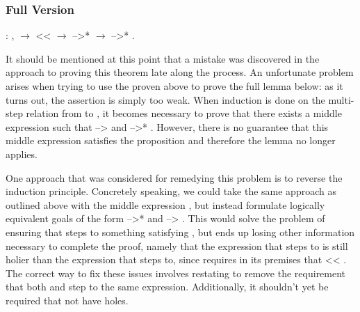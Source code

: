 \documentclass[12pt]{report}
\begin{document}
\subsubsection{Full Version}

\begin{coqdoccode}
\coqdocemptyline
\coqdocindent{1.00em}
  : \coqdockw{\ensuremath{\forall}}   ,\coqdoceol
\coqdocindent{2.00em}
  \ensuremath{\rightarrow}\coqdoceol
\coqdocindent{2.00em}
 <<  \ensuremath{\rightarrow}\coqdoceol
\coqdocindent{2.00em}
 -->*  \ensuremath{\rightarrow}\coqdoceol
\coqdocindent{2.00em}
 -->* .\coqdoceol
\coqdocemptyline
\end{coqdoccode}

It should be mentioned at this point that a mistake was discovered in
the approach to proving this theorem late along the process. An
unfortunate problem arises when trying to use the
 proven above to prove the full
 lemma below: as it turns out, the assertion
is simply too weak. When induction is done on the multi-step relation
from  to , it becomes necessary to prove
that there exists a middle expression  such that
 -->  and  -->* .
However, there is no guarantee that this middle expression satisfies
the  proposition and therefore the
 lemma no longer applies. 

One approach that was considered for remedying this problem is to
reverse the induction principle. Concretely speaking, we could take
the same approach as outlined above with the middle expression
, but instead formulate logically equivalent goals of
the form  -->*  and  -->
. This would solve the problem of ensuring that
 steps to something satisfying , but
ends up losing other information necessary to complete the proof,
namely that the expression  that  steps to
is still holier than the expression  that
 steps to, since 
requires in its premises that  << . The
correct way to fix these issues involves restating
 to remove the requirement that
both  and  step to the same expression.
Additionally, it shouldn't yet be required that  not
have holes.
\end{document}

